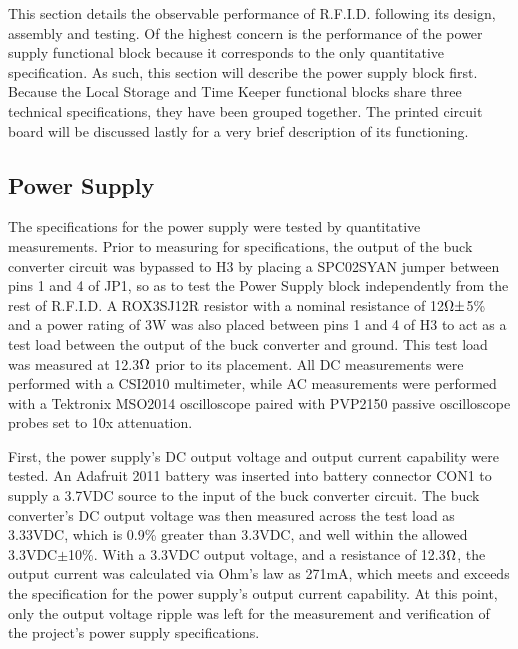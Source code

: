     This section details the observable performance of R.F.I.D. following its design, assembly and testing.
    Of the highest concern is the performance of the power supply functional block because it corresponds to the only quantitative specification. As such, this section will describe the power supply block first.
    Because the Local Storage and Time Keeper functional blocks share three technical specifications, they have been grouped together.
    The printed circuit board will be discussed lastly for a very brief description of its functioning.

\subsection{Power Supply}
The specifications for the power supply were tested by quantitative measurements.  Prior to measuring for specifications, the output of the buck converter circuit was bypassed to H3 by placing a SPC02SYAN jumper between pins 1 and 4 of JP1, so as to test the Power Supply block independently from the rest of R.F.I.D. A ROX3SJ12R resistor with a nominal resistance of 12$\ohm{\pm}$5\% and a power rating of 3W was also placed between pins 1 and 4 of H3 to act as a test load between the output of the buck converter and ground. This test load was measured at 12.3$\ohm$ prior to its placement. All DC measurements were performed with a CSI2010 multimeter, while AC measurements were performed with a Tektronix MSO2014 oscilloscope paired with PVP2150 passive oscilloscope probes set to 10x attenuation.

First, the power supply's DC output voltage and output current capability were tested. An Adafruit 2011 battery was inserted into battery connector CON1 to supply a 3.7VDC source to the input of the buck converter circuit. The buck converter's DC output voltage was then measured across the test load as 3.33VDC, which is 0.9\% greater than 3.3VDC, and well within the allowed 3.3VDC$\pm$10\%. With a 3.3VDC output voltage, and a resistance of 12.3$\ohm$, the output current was calculated via Ohm's law as 271mA, which meets and exceeds the specification for the power supply's output current capability. At this point, only the output voltage ripple was left for the measurement and verification of the project's power supply specifications.


